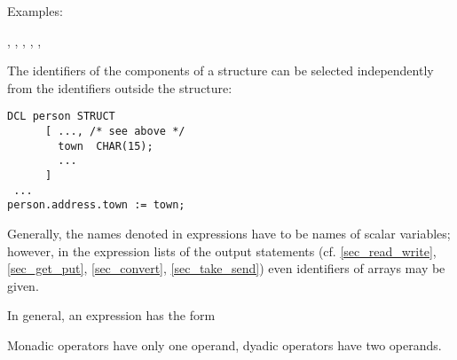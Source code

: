 \begin{grammarframe}


\end{grammarframe}

Examples:

, , , , , 

The identifiers of the components of a structure can be selected
independently from the identifiers outside the structure:

\begin{lstlisting}
DCL person STRUCT
      [ ..., /* see above */ 
        town  CHAR(15);
        ...
      ]
 ...
person.address.town := town;
\end{lstlisting}

Generally, the names denoted in expressions have to be names of scalar
variables; however, in the expression lists of the output statements
(cf. \ref{sec_read_write}, \ref{sec_get_put}, \ref{sec_convert}, 
\ref{sec_take_send}) even identifiers of arrays may be given.

In general, an expression has the form

\begin{grammarframe}

\end{grammarframe}

Monadic operators have only one operand, dyadic operators have two
operands.

\begin{grammarframe}





\end{grammarframe}


